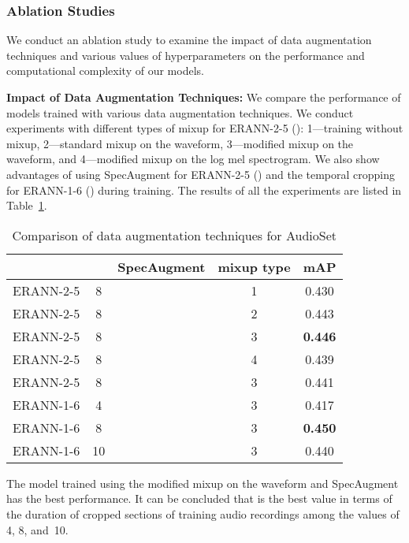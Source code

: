 \documentclass{article}
\begin{document}
\begin{sloppy}
\subsubsection{Ablation Studies}

We conduct an ablation study to examine the impact of data augmentation techniques and various values of hyperparameters on the performance and computational complexity of our models.

\vspace{3mm}

\noindent\textbf{Impact of Data Augmentation Techniques:} We compare the performance of models trained with various data augmentation techniques. We conduct experiments with different types of mixup for \mbox{ERANN-2-5} (): 1---training without mixup, 2---standard mixup on the waveform, 3---modified mixup on the waveform, and 4---modified mixup on the log mel spectrogram. We also show advantages of using SpecAugment for \mbox{ERANN-2-5} () and the temporal cropping for \mbox{ERANN-1-6} () during training. The results of all the experiments are listed in Table~\ref{tab:tableaug}.

\vspace{-1.5em}
\begin{table}[h!]
  \caption{Comparison of data augmentation techniques for AudioSet}
  
  \centering
  \begin{tabular}{lcccc}
  \hline
\textbf{}&  \textbf{}& \textbf{SpecAugment} & 
                                         \textbf{mixup type}  & 
                                         \textbf{mAP}\\
    \hline
ERANN-2-5      & 8 &   & 1 & 0.430\\ 
ERANN-2-5     & 8 &   & 2 & 0.443 \\ 
ERANN-2-5    & 8 &   & 3 &\textbf{0.446}\\  
ERANN-2-5      & 8 &   & 4 & 0.439\\ 
\hline
ERANN-2-5     & 8 &  & 3  & 0.441 \\ 
\hline
ERANN-1-6      & 4 &   & 3  & 0.417\\  
ERANN-1-6      & 8 &   & 3  & \textbf{0.450}\\  
ERANN-1-6      & 10 &   & 3 &0.440 \\\hline
  \end{tabular}
  \label{tab:tableaug}
\end{table}


The model trained using the modified mixup on the waveform and SpecAugment has the best performance. It can be concluded that  is the best value in terms of the duration of cropped sections of training audio recordings among the values of 4, 8, \hbox{and 10}.


\end{sloppy}
\end{document}
